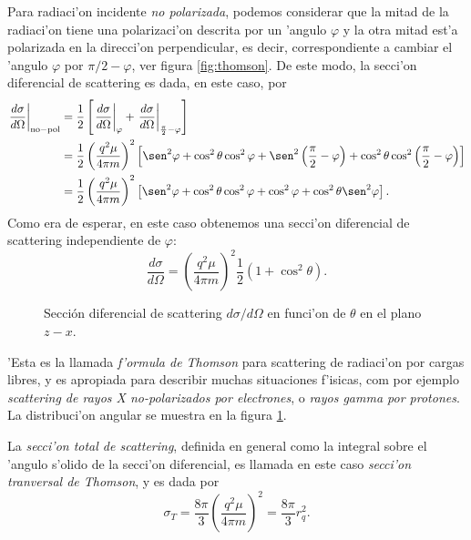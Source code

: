Para radiaci'on incidente \textit{no polarizada}, podemos considerar que la
mitad de la radiaci'on tiene una polarizaci'on descrita por un 'angulo $\varphi$
y la otra mitad est'a polarizada en la direcci'on perpendicular, es decir,
correspondiente a cambiar el 'angulo $\varphi$ por ${\pi}/{2}-\varphi$, ver figura  \ref{fig:thomson}. De este modo, la secci'on diferencial de scattering es dada, en este caso, por
\begin{align}
\left. \frac{d\sigma}{d\Omega}\right|_{\rm no-pol}&=\frac{1}{2}\left[\left.
\frac{d\sigma}{d\Omega}\right|_\varphi+\left.
\frac{d\sigma}{d\Omega}\right|_{\frac{\pi}{2}-\varphi}\right] \\
&=\frac{1}{2}\left(\frac{q^2\mu}{4\pi m}\right)^2\left[\sen^2\varphi+\cos^2\theta\cos^2\varphi
+\sen^2\left(\frac{\pi}{2}-\varphi\right)+\cos^2\theta\cos^2\left(\frac{\pi}{2}-\varphi\right)\right] \\
&=\frac{1}{2}\left(\frac{q^2\mu}{4\pi m}\right)^2\left[\sen^2\varphi+\cos^2\theta\cos^2\varphi
+\cos^2\varphi+\cos^2\theta\sen^2\varphi\right].
\end{align}
Como era de esperar, en este caso obtenemos una secci'on diferencial de scattering independiente de $\varphi$:
\begin{equation}
\boxed{\frac{d\sigma}{d\Omega}=\left(\frac{q^2\mu}{4\pi m}\right)^2\frac{1}
{2}\left(  1+\cos^2\theta\right) .}
\end{equation}
\begin{figure}[H]
\centerline{}
 \caption{Secci\'on diferencial de scattering $d\sigma/d\Omega$ en funci'on de $\theta$ en el plano $z-x$.}
\label{fig:thomson_2d}
\end{figure}
'Esta es la llamada \textit{f'ormula de Thomson} para scattering de radiaci'on
por cargas libres, y es apropiada para describir muchas situaciones f'isicas, com por ejemplo \textit{scattering de rayos X
no-polarizados por electrones}, o \textit{rayos gamma por protones}. 
La distribuci'on angular se muestra en la figura \ref{fig:thomson_2d}. 

La \textit{secci'on total de scattering}, definida en general como la integral sobre el 'angulo s'olido de la secci'on diferencial, es llamada en este caso \textit{secci'on tranversal de Thomson}, y es dada por
\begin{equation}
\boxed{\sigma_{T}=\frac{8\pi}{3}\left(\frac{q^2\mu}{4\pi m}\right)^2=\frac{8\pi}{3} r_q^2.}
\end{equation}

